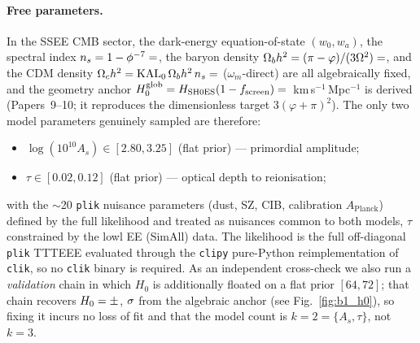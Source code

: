 \documentclass[12pt,a4paper]{article}
\begin{document}
\paragraph{Free parameters.}
In the SSEE CMB sector, the dark-energy equation-of-state $(w_0,w_a)$, the spectral index $n_s = 1 - \phi^{-7} = \val{N_S_d6}$, the baryon density $\Omega_b h^2 = (\pi-\varphi)/(3\Omega^2) = \val{OMEGA_B_H2_d6}$, and the CDM density $\Omega_c h^2 = \mathrm{KAL}_0\,\Omega_b h^2\,n_s = \val{OMEGA_C_H2_d6}$ ($\omega_m$-direct) are all algebraically fixed, and the geometry anchor $H_0^{\rm glob}=H_{\rm SH0ES}(1-f_{\rm screen})=\val{H0_GLOBAL_d5}$~km\,s$^{-1}$\,Mpc$^{-1}$ is derived (Papers~9--10; it reproduces the dimensionless target $3(\varphi+\pi)^2$). The only two model parameters genuinely sampled are therefore:

\begin{itemize}[noitemsep]
    \item $\log(10^{10}A_s) \in [2.80, 3.25]$ (flat prior) — primordial amplitude;
    \item $\tau \in [0.02, 0.12]$ (flat prior) — optical depth to reionisation;
\end{itemize}
with the $\sim$20 \texttt{plik} nuisance parameters (dust, SZ, CIB, calibration $A_\mathrm{Planck}$) defined by the full likelihood and treated as nuisances common to both models, $\tau$ constrained by the lowl EE (SimAll) data. The likelihood is the full off-diagonal \texttt{plik} TTTEEE evaluated through the \texttt{clipy} pure-Python reimplementation of \texttt{clik}, so no \texttt{clik} binary is required. As an independent cross-check we also run a \emph{validation} chain in which $H_0$ is additionally floated on a flat prior $[64,72]$; that chain recovers $H_0=\val{b1v_H0}\pm\val{b1v_H0_s}$, $\val{b1v_d}\sigma$ from the algebraic anchor (see Fig.~\ref{fig:b1_h0}), so fixing it incurs no loss of fit and that the model count is $k=2=\{A_s,\tau\}$, not $k=3$.
\end{document}
